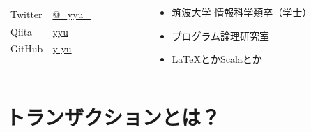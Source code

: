 \begin{frame}
\begin{columns}
\begin{column}{0.4\textwidth}
      \begin{table}[h]
        \begin{tabular}{ll}
          Twitter & \href{https://twitter.com/\_yyu\_}{@\_yyu\_} \\
          Qiita &  \href{https://qiita.com/yyu}{yyu} \\
          GitHub &  \href{https://github.com/y-yu}{y-yu} \\
        \end{tabular}
      \end{table}
    \end{column}
    \begin{column}{0.6\textwidth}
      \pause
      \begin{itemize}
        \item<+-> 筑波大学 情報科学類卒（学士）
        \item<+-> プログラム論理研究室
        \item<+-> \LaTeX とかScalaとか
      \end{itemize}
    \end{column}
  \end{columns}
\end{frame}

\section{トランザクションとは？}

